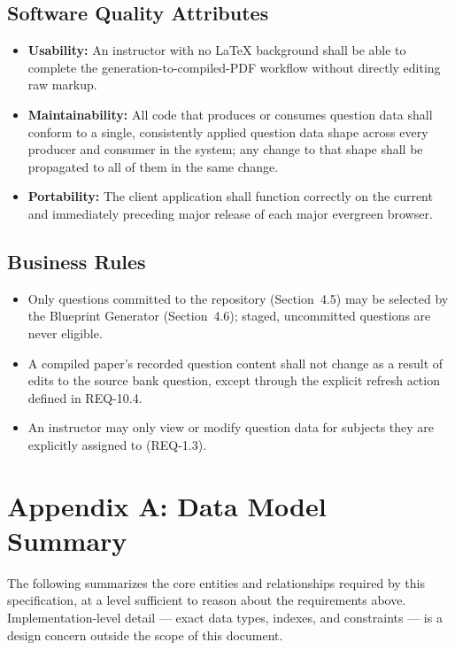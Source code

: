 \documentclass[11pt]{article}
\begin{document}
\subsection{Software Quality Attributes}
\begin{itemize}[nosep]
  \item \textbf{Usability:} An instructor with no LaTeX background shall be
    able to complete the generation-to-compiled-PDF workflow without
    directly editing raw markup.
  \item \textbf{Maintainability:} All code that produces or consumes
    question data shall conform to a single, consistently applied question
    data shape across every producer and consumer in the system; any
    change to that shape shall be propagated to all of them in the same
    change.
  \item \textbf{Portability:} The client application shall function
    correctly on the current and immediately preceding major release of
    each major evergreen browser.
\end{itemize}

\subsection{Business Rules}
\begin{itemize}[nosep]
  \item Only questions committed to the repository (Section~4.5) may be
    selected by the Blueprint Generator (Section~4.6); staged, uncommitted
    questions are never eligible.
  \item A compiled paper's recorded question content shall not change as a
    result of edits to the source bank question, except through the
    explicit refresh action defined in REQ-10.4.
  \item An instructor may only view or modify question data for subjects
    they are explicitly assigned to (REQ-1.3).
\end{itemize}

\section*{Appendix A: Data Model Summary}

The following summarizes the core entities and relationships required by
this specification, at a level sufficient to reason about the requirements
above. Implementation-level detail --- exact data types, indexes, and
constraints --- is a design concern outside the scope of this document.
\end{document}
